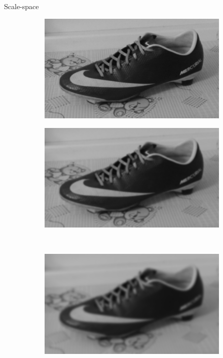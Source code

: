 \documentclass[14pt,t]{beamer}
\begin{document}
\begin{frame}{Scale-space}
\begin{figure}[p]
	\centering
	\begin{subfigure}[t]{0.4\textwidth}
		\includegraphics[width=\textwidth]{img/scaleSpaceTheory_2.png}
	\end{subfigure}
	\begin{subfigure}[t]{0.4\textwidth}
		\includegraphics[width=\textwidth]{img/scaleSpaceTheory_4.png}
	\end{subfigure}\\
	\vspace{0.75mm}
	\begin{subfigure}[t]{0.4\textwidth}
		\includegraphics[width=\textwidth]{img/scaleSpaceTheory_8.png}

\end{subfigure}
\end{figure}
\end{frame}
\end{document}
